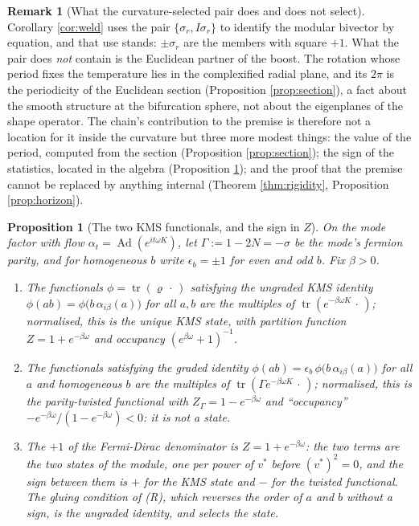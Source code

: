 \documentclass[11pt]{article}
\newtheorem{proposition}[theorem]{Proposition}
\theoremstyle{definition}
\newtheorem{remark}[theorem]{Remark}
\newcommand{\tr}{\operatorname{tr}}
\begin{document}
\begin{remark}[What the curvature-selected pair does and does not select]\label{rem:pair}
Corollary \ref{cor:weld} uses the pair $\{\sigma_r, I\sigma_r\}$ to identify the modular bivector by equation, and that use stands: $\pm\sigma_r$ are the members with square $+1$. What the pair does \emph{not} contain is the Euclidean partner of the boost. The rotation whose period fixes the temperature lies in the complexified radial plane, and its $2\pi$ is the periodicity of the Euclidean section (Proposition \ref{prop:section}), a fact about the smooth structure at the bifurcation sphere, not about the eigenplanes of the shape operator. The chain's contribution to the premise is therefore not a location for it inside the curvature but three more modest things: the value of the period, computed from the section (Proposition \ref{prop:section}); the sign of the statistics, located in the algebra (Proposition \ref{prop:statistics}); and the proof that the premise cannot be replaced by anything internal (Theorem \ref{thm:rigidity}, Proposition \ref{prop:horizon}).
\end{remark}

\begin{proposition}[The two KMS functionals, and the sign in $Z$]\label{prop:statistics}
On the mode factor with flow $\alpha_t = \operatorname{Ad}(e^{it\omega K})$, let $\Gamma := 1 - 2N = -\sigma$ be the mode's fermion parity, and for homogeneous $b$ write $\epsilon_b = \pm 1$ for even and odd $b$. Fix $\beta > 0$.
\begin{enumerate}
\item The functionals $\phi = \tr(\varrho\,\cdot\,)$ satisfying the \emph{ungraded} KMS identity $\phi(ab) = \phi\bigl(b\,\alpha_{i\beta}(a)\bigr)$ for all $a, b$ are the multiples of $\tr(e^{-\beta\omega K}\,\cdot\,)$; normalised, this is the unique KMS state, with partition function $Z = 1 + e^{-\beta\omega}$ and occupancy $(e^{\beta\omega} + 1)^{-1}$.
\item The functionals satisfying the \emph{graded} identity $\phi(ab) = \epsilon_b\,\phi\bigl(b\,\alpha_{i\beta}(a)\bigr)$ for all $a$ and homogeneous $b$ are the multiples of $\tr(\Gamma e^{-\beta\omega K}\,\cdot\,)$; normalised, this is the parity-twisted functional with $Z_\Gamma = 1 - e^{-\beta\omega}$ and ``occupancy'' $-e^{-\beta\omega}/(1 - e^{-\beta\omega}) < 0$: it is not a state.
\item The $+1$ of the Fermi-Dirac denominator is $Z = 1 + e^{-\beta\omega}$: the two terms are the two states of the module, one per power of $v^{*}$ before $(v^{*})^{2} = 0$, and the sign between them is $+$ for the KMS state and $-$ for the twisted functional. The gluing condition of (R), which reverses the order of $a$ and $b$ without a sign, is the ungraded identity, and selects the state.
\end{enumerate}
\end{proposition}
\end{document}
